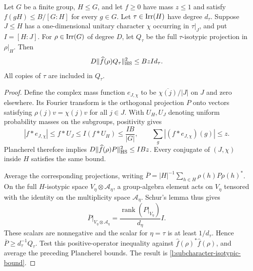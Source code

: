\begin{lemma}
\label{l:subcharacter-isotypic}
Let $G$ be a finite group, $H\le G$, and let $f\ge0$ have mass
$z\le1$ and satisfy
$f(gH)\le B/[G:H]$ for every $g\in G$.  Let $\tau\in\operatorname{Irr}(H)$
have degree $d_\tau$.  Suppose $J\le H$ has a one-dimensional
unitary character $\chi$ occurring in $\tau|_J$, and put $I=[H:J]$.
For $\rho\in\operatorname{Irr}(G)$ of degree $D$, let $Q_\tau$ be the full
$\tau$-isotypic projection in $\rho|_H$.  Then
\begin{equation}\label{l:subcharacter-isotypic-bound}
 D\|\widehat f(\rho)Q_\tau\|_{\mathrm{HS}}^2
 \le BzI d_\tau.
\end{equation}
All copies of $\tau$ are included in $Q_\tau$.
\end{lemma}
\begin{proof}
Define the complex mass function $e_{J,\chi}$ to be
$\overline{\chi(j)}/|J|$ on $J$ and zero elsewhere.  Its Fourier
transform is the orthogonal projection $P$ onto vectors satisfying
$\rho(j)v=\chi(j)v$ for all $j\in J$.  With $U_H,U_J$ denoting
uniform probability masses on the subgroups, positivity gives
\[
 |f*e_{J,\chi}|\le f*U_J\le I(f*U_H)\le\frac{IB}{|G|},
 \qquad \sum_g|(f*e_{J,\chi})(g)|\le z.
\]
Plancherel therefore implies
$D\|\widehat f(\rho)P\|_{\mathrm{HS}}^2\le IBz$.
Every conjugate of $(J,\chi)$ inside $H$ satisfies the same bound.

Average the corresponding projections, writing
$\overline P=|H|^{-1}\sum_{h\in H}\rho(h)P\rho(h)^*$.
On the full $H$-isotypic space $V_\eta\otimes\mathcal A_\eta$,
a group-algebra element acts on $V_\eta$ tensored with the identity
on the multiplicity space $\mathcal A_\eta$.  Schur's lemma thus
gives
\[
 \overline P|_{V_\eta\otimes\mathcal A_\eta}
   =\frac{\operatorname{rank}(P|_{V_\eta})}{d_\eta}I.
\]
These scalars are nonnegative and the scalar for $\eta=\tau$ is
at least $1/d_\tau$.  Hence $\overline P\ge d_\tau^{-1}Q_\tau$.
Test this positive-operator inequality against
$\widehat f(\rho)^*\widehat f(\rho)$, and average the preceding
Plancherel bounds.  The result is
\eqref{l:subcharacter-isotypic-bound}.
\end{proof}

